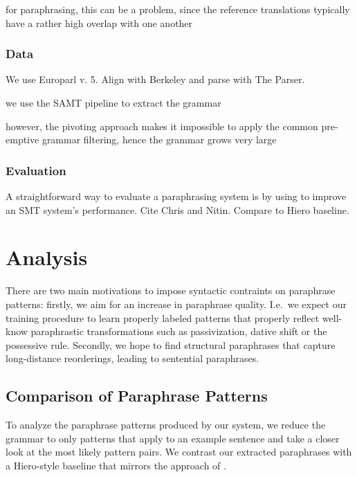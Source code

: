 \documentclass[11pt]{article}
\newcommand{\mnote}[1]{\marginpar{%
  \vskip-\baselineskip
  \raggedright\footnotesize
  \itshape\hrule\smallskip\tiny{#1}\par\smallskip\hrule}}
\begin{document}
for paraphrasing, this can be a problem, since the reference
translations typically have a rather high overlap with one another
\mnote{get some numbers to back that up}


\subsubsection{Data} \label{data}

We use Europarl v. 5. Align with Berkeley and parse with The Parser.

we use the SAMT pipeline to extract the grammar

however, the pivoting approach makes it impossible to apply the common pre-emptive
grammar filtering, hence the grammar grows very large

\subsubsection{Evaluation} \label{evaluation}

A straightforward way to evaluate a paraphrasing system is by using to
improve an SMT system's performance. Cite Chris and Nitin. Compare to
Hiero baseline.



\section{Analysis} \label{analysis}

There are two main motivations to impose syntactic contraints on
paraphrase patterns: firstly, we aim for an increase in paraphrase
quality. I.e.\ we expect our training procedure to learn properly
labeled patterns that properly reflect well-know paraphrastic
transformations such as passivization, dative shift or the possessive
rule. Secondly, we hope to find structural paraphrases that capture
long-distance reorderings, leading to sentential paraphrases.

\subsection{Comparison of Paraphrase
  Patterns} \label{pattern_comparison}

To analyze the paraphrase patterns produced by our system, we reduce
the grammar to only patterns that apply to an example sentence and
take a closer look at the most likely pattern pairs. We contrast our
extracted paraphrases with a Hiero-style baseline that mirrors the
approach of . 
\end{document}
